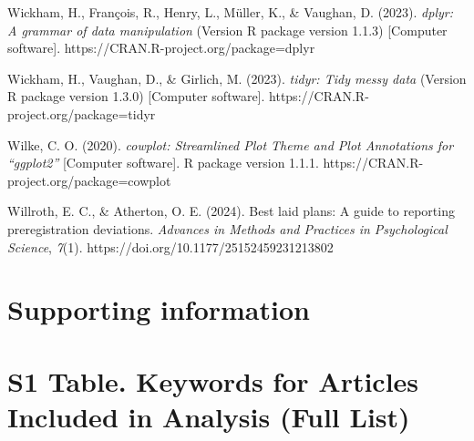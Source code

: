 \documentclass[authordate, empirical]{jote-new-article}
\begin{document}
	Wickham, H., François, R., Henry, L., Müller, K., \& Vaughan, D. (2023). \emph{dplyr: A grammar of data manipulation} (Version R package version 1.1.3) [Computer software]. https://CRAN.R-project.org/package=dplyr



	Wickham, H., Vaughan, D., \& Girlich, M. (2023). \emph{tidyr: Tidy messy data} (Version R package version 1.3.0) [Computer software]. https://CRAN.R-project.org/package=tidyr



	Wilke, C. O. (2020). \emph{cowplot: Streamlined Plot Theme and Plot Annotations for “ggplot2”} [Computer software]. R package version 1.1.1. https://CRAN.R-project.org/package=cowplot



	Willroth, E. C., \& Atherton, O. E. (2024). Best laid plans: A guide to reporting preregistration deviations. \emph{Advances in Methods and Practices in Psychological Science}, \emph{7}(1). https://doi.org/10.1177/25152459231213802











	\section{\textbf{Supporting information}}







	\section{\textbf{S1 Table. Keywords for Articles Included in Analysis (Full List)}}
\end{document}
